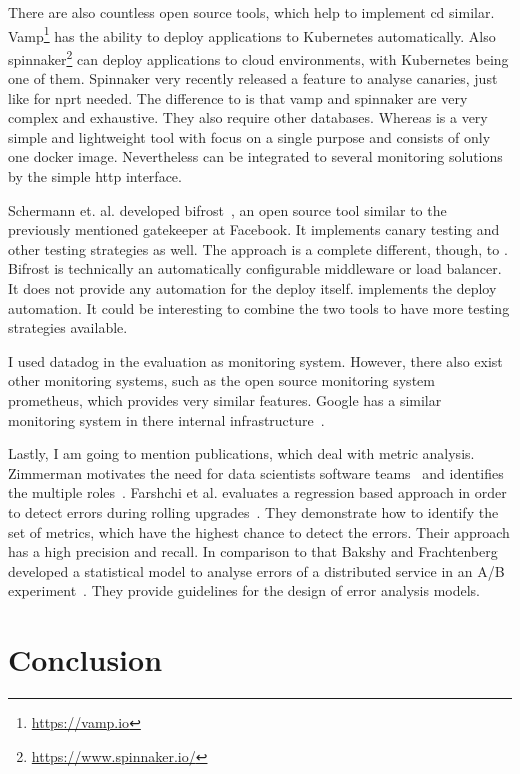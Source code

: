 There are also countless open source tools, which help to implement \gls{cd}
similar. Vamp\footnote{\url{https://vamp.io}} has the ability to deploy applications to
Kubernetes automatically. Also spinnaker\footnote{\url{https://www.spinnaker.io/}} can
deploy applications to cloud environments, with Kubernetes being one of them. Spinnaker
very recently released a feature to analyse canaries, just like for \gls{nprt} needed. The
difference to \deployer is that vamp and spinnaker are very complex and exhaustive. They
also require other databases. Whereas \deployer is a very simple and lightweight tool with
focus on a single purpose and consists of only one docker image. Nevertheless \deployer can
be integrated to several monitoring solutions by the simple http interface.

Schermann et. al. developed bifrost~\cite{bifrost}, an open source tool similar to the
previously mentioned gatekeeper at Facebook. It implements canary testing and other
testing strategies as well. The approach is a complete different, though, to
\deployer. Bifrost is technically an automatically configurable middleware or
load balancer. It does not provide any automation for the deploy itself. \deployer
implements the deploy automation. It could be interesting to combine the two tools to have
more testing strategies available.

I used datadog in the evaluation as monitoring system. However, there also exist other
monitoring systems, such as the open source monitoring system prometheus, which provides
very similar features. Google has a similar monitoring system in there internal
infrastructure~\cite{sre_monitoring}.

Lastly, I am going to mention publications, which deal with metric analysis. Zimmerman
motivates the need for data scientists software teams~\cite{data_science_role2} and
identifies the multiple roles~\cite{data_science_role}. Farshchi et al. evaluates a
regression based approach in order to detect errors during rolling
upgrades~\cite{anomaly_detection}. They demonstrate how to identify the set of metrics,
which have the highest chance to detect the errors. Their approach has a high precision
and recall. In comparison to that Bakshy and Frachtenberg developed a statistical model to
analyse errors of a distributed service in an A/B
experiment~\cite{error_analysis_of_distr_system}. They provide guidelines for the design
of error analysis models.

\chapter{Conclusion}
\label{chap:conclusion}


